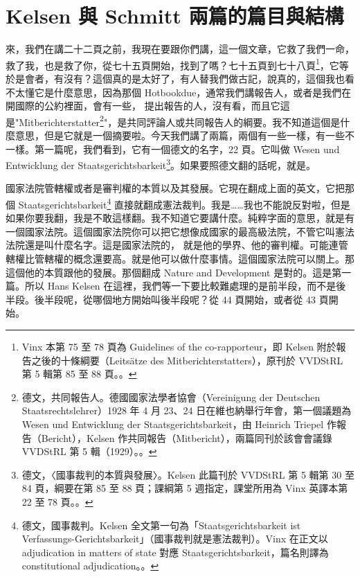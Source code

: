 \section{Kelsen 與 Schmitt 兩篇的篇目與結構}

\hypertarget{w05:cue:17}{}來，我們在講二十二頁之前，我現在要跟你們講，這一個文章，它救了我們一命，救了我，也是救了你，從七十五頁開始，找到了嗎？七十五頁到七十八頁\footnote{Vinx 本第 75 至 78 頁為 Guidelines of the co-rapporteur，即 Kelsen 附於報告之後的十條綱要（Leitsätze des Mitberichterstatters），原刊於 VVDStRL 第 5 輯第 85 至 88 頁。\cite[85--88]{kelsen1929}。}，它等於是會者，有沒有？這個真的是太好了，有人替我們做古記，說真的，這個我也看不太懂它是什麼意思，因為那個 Hotbookdue，通常我們講報告人，或者是我們在開國際的公約裡面，會有一些，
\hypertarget{w05:cue:18}{}提出報告的人，沒有看，而且它這是"Mitberichterstatter\footnote{德文，共同報告人。德國國家法學者協會（Vereinigung der Deutschen Staatsrechtslehrer）1928 年 4 月 23、24 日在維也納舉行年會，第一個議題為 Wesen und Entwicklung der Staatsgerichtsbarkeit，由 Heinrich Triepel 作報告（Bericht），Kelsen 作共同報告（Mitbericht），兩篇同刊於該會會議錄 VVDStRL 第 5 輯（1929）。\cite{triepel1929}。}"，是共同評論人或共同報告人的綱要。我不知道這個是什麼意思，但是它就是一個摘要啦。今天我們講了兩篇，兩個有一些一樣，有一些不一樣。第一篇呢，我們看到，它有一個德文的名字，22 頁。它叫做 Wesen und Entwicklung der Staatsgerichtsbarkeit\footnote{德文，〈國事裁判的本質與發展〉。Kelsen 此篇刊於 VVDStRL 第 5 輯第 30 至 84 頁，綱要在第 85 至 88 頁；課綱第 5 週指定，課堂所用為 Vinx 英譯本第 22 至 78 頁。\cite{kelsen1929}。}。如果要照德文翻的話呢，就是。

\hypertarget{w05:cue:19}{}國家法院管轄權或者是審判權的本質以及其發展。它現在翻成上面的英文，它把那個 Staatsgerichtsbarkeit\footnote{德文，國事裁判。Kelsen 全文第一句為「Staatsgerichtsbarkeit ist Verfassungs-Gerichtsbarkeit」（國事裁判就是憲法裁判）。Vinx 在正文以 adjudication in matters of state 對應 Staatsgerichtsbarkeit，篇名則譯為 constitutional adjudication。\cite[30]{kelsen1929}。} 直接就翻成憲法裁判。我是……我也不能說反對啦，但是如果你要我翻，我是不敢這樣翻。我不知道它要講什麼。純粹字面的意思，就是有一個國家法院。這個國家法院你可以把它想像成國家的最高級法院，不管它叫憲法法院還是叫什麼名字。這是國家法院的，
\hypertarget{w05:cue:20}{}就是他的學界、他的審判權。可能連管轄權比管轄權的概念還要高。就是他可以做什麼事情。這個國家法院可以關上。那這個他的本質跟他的發展。那個翻成 Nature and Development 是對的。這是第一篇。所以 Hans Kelsen 在這裡，我們等一下要比較難處理的是前半段，而不是後半段。後半段呢，從哪個地方開始叫後半段呢？從 44 頁開始，或者從 43 頁開始。

